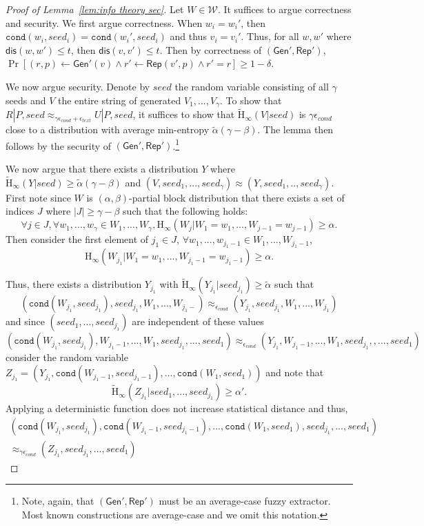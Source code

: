 \documentclass[11pt]{article}
\newcommand{\lemref}[1]{\mbox{Lemma~\ref{#1}}}
\newcommand{\class}[1]{{\ensuremath{\mathsf{#1}}}}
\newcommand{\gen}{\ensuremath{\class{Gen}}\xspace}
\newcommand{\rep}{\ensuremath{\class{Rep}}\xspace}
\newcommand{\dis}{\ensuremath{\mathsf{dis}}}
\newcommand{\Hoo}{\mathrm{H}_\infty}
\newcommand{\Hav}{\tilde{\mathrm{H}}_\infty}
\newcommand{\ext}{\ensuremath{\mathtt{ext}}}
\newcommand{\cond}{\ensuremath{\mathtt{cond}}}
\begin{document}
\begin{proof}[Proof of \lemref{lem:info theory sec}]
Let $W\in \mathcal{W}$.
It suffices to argue correctness and security.  We first argue correctness.
When $w_i = w_i'$, then $\cond(w_i , seed_i) = \cond(w_i', seed_i)$ and thus $v_i = v_i'$.  Thus, for all $w, w'$ where $\dis(w, w')\le t$, then $\dis (v, v')\le t$.  Then by correctness of $(\gen', \rep')$, $\Pr[(r, p)\leftarrow \gen'(v) \wedge r'\leftarrow \rep(v',p) \wedge r' = r]\ge 1-\delta$.

We now argue security.  Denote by $seed$ the random variable consisting of all $\gamma$ seeds and $V$ the entire string of generated $V_1,..., V_\gamma$.  To show that $R | P, seed \approx_{\gamma \epsilon_{cond} + \epsilon_{text}} U | P, seed$, it suffices to show that $\Hav(V | seed)$ is $\gamma \epsilon_{cond}$ close to a distribution with average min-entropy $\tilde{\alpha}(\gamma - \beta)$.  The lemma then follows by the security of $(\gen', \rep')$.\footnote{Note, again, that $(\gen', \rep')$ must be an average-case fuzzy extractor.  Most known constructions are average-case and we omit this notation.}

We now argue that there exists a distribution $Y$ where $\Hav(Y | seed)\ge \tilde{\alpha}(\gamma - \beta)$ and $(V, seed_1,..., seed_\gamma)\approx (Y, seed_1,.., seed_\gamma)$.  First note since $W$ is $(\alpha, \beta)$-partial block distribution that
there exists a set of indices $J$ where $|J| \geq \gamma - \beta$ such that the following holds:
\[
\forall j\in J, \forall w_1,..., w_\gamma \in W_1,..., W_\gamma, \Hoo(W_j | W_1 = w_1,..., W_{j-1}=w_{j-1}) \geq \alpha.
\]
Then consider the first element of $j_1\in J$, $\forall w_1,..., w_{j_1-1}\in W_1,..., W_{j_1-1}$,
\[\Hoo(W_{j_1} | W_1 = w_1,..., W_{j_1-1} = w_{j_1-1})\ge \alpha.\]

\noindent
Thus, there exists a distribution $Y_{j_1}$ with $\Hav(Y_{j_1} | seed_{j_1}) \ge \tilde{\alpha}$ such that
\[(\cond (W_{j_1}, seed_{j_1}), seed_{j_1}, W_1,..., W_{j_1-}) \approx_{\epsilon_{cond}} (Y_{j_1}, seed_{j_1}, W_1,..., W_{j_1})\]
and since $(seed_1,..., seed_{j_1})$ are independent of these values
\[(\cond (W_{j_1},seed_{j_1}), W_{j_1-1},..., W_1, seed_{j_1}, ..., seed_{1}) \approx_{\epsilon_{cond}} (Y_{j_1}, W_{j_1-1},..., W_1, seed_{j_1}, , ...,  seed_{1})\]
consider the random variable $Z_{j_1} =( Y_{j_1}, \cond(W_{j_1-1},seed_{j_1-1}),..., \cond(W_{1}, seed_{1}))$ and note that \[\Hav(Z_{j_1} | seed_1,...,seed_{j_1})\ge \alpha'.\]
Applying a deterministic function does not increase statistical distance and thus,
\begin{align*}
(\cond (W_{j_1}, seed_{j_1}), \cond(W_{j_1-1}, seed_{j_1-1}),..., \cond(W_1, seed_1), seed_{j_1},..., seed_{1}) \\\approx_{\gamma \epsilon_{cond}} (Z_{j_1}, seed_{j_1},..., seed_1)
\end{align*}


\end{proof}
\end{document}
